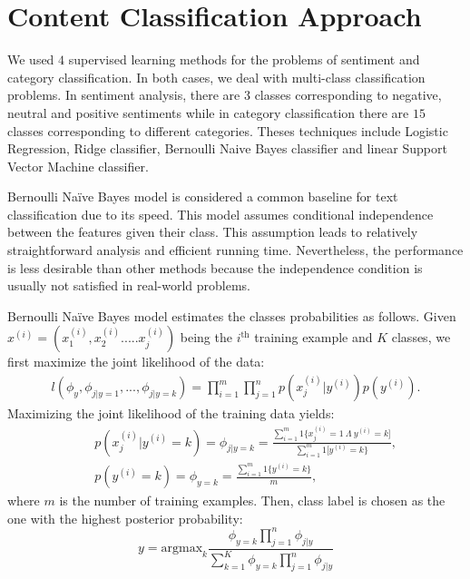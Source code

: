\section{Content Classification Approach}
\label{sec:approach}
We used $4$ supervised learning methods for the problems of sentiment and category classification.
In both cases, we deal with multi-class classification problems. In sentiment analysis, there are $3$ classes corresponding to negative, neutral and positive sentiments while in category classification there are $15$ classes corresponding to different categories.
Theses techniques include Logistic Regression, Ridge classifier, Bernoulli Naive Bayes classifier and linear Support Vector Machine classifier.

Bernoulli Naïve Bayes model is considered a common baseline for text classification due to its speed.
This model assumes conditional independence between the features given their class. This assumption leads to relatively straightforward analysis and efficient running time. Nevertheless, the performance is less desirable than other methods because the independence condition is usually not satisfied in real-world problems.

Bernoulli Naïve Bayes model estimates the classes probabilities as follows.
Given $x^{(i)}=(x_1^{(i)},x_2^{(i)}.....x_j^{(i)})$ being the $i^{\mathrm{th}}$ training example and $K$ classes, we first maximize the joint likelihood of the data:
\begin{eqnarray*}
l(\phi_y,\phi_{j|y=1},...,\phi_{j|y=k}) = \prod_{i = 1}^{m} \prod_{j = 1}^{n} p(x_j^{(i)}|y^{(i)})p(y^{(i)}).
\end{eqnarray*}
Maximizing the joint likelihood of the training data yields:
\begin{eqnarray*}
&&p(x_j^{(i)}|y^{(i)}=k) = \phi_{j|y=k}=\frac{\sum_{i = 1}^{m} 1 \{x_j^{(i)} = 1 \: \Lambda \: y^{(i)}=k]}{\sum_{i = 1}^{m}1[y^{(i)}=k\}}, \\
&&p(y^{(i)}=k) = \phi_{y=k} = \frac{\sum_{i = 1}^{m} 1\{y^{(i)}=k\}}{m},
\end{eqnarray*}
where $m$ is the number of training examples.
Then, class label is chosen as the one with the highest posterior probability:
\begin{equation*}
y = \mathrm{argmax}_k \frac{\phi_{y=k} \prod_{j = 1}^{n} \phi_{j|y}}{\sum_{k = 1}^{K} \phi_{y=k} \prod_{j = 1}^{n} \phi_{j|y}}
\end{equation*}


